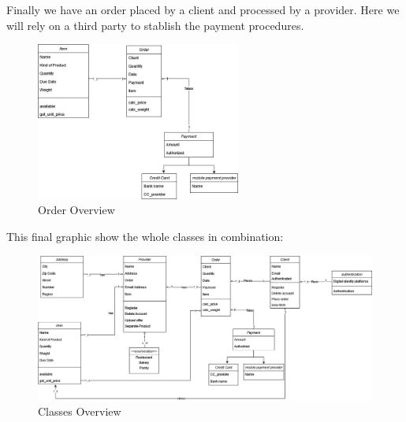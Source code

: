 Finally we have an order placed by a \gls{client} and processed by a \gls{provider}. Here we will rely on a third party 
to stablish the payment procedures.

\begin{figure}[H]
    \centering
    \includegraphics[width=0.6\textwidth]{assets/order_cd.jpg}
    \caption{Order Overview}
    \label{fig:order_cd}
\end{figure}

\newpage
\thispagestyle{lscape}
\begin{landscape}

This final graphic show the whole classes in combination:

\begin{figure}[H]
    \centering
    \includegraphics[width=1.5\textwidth]{assets/classes_CD.jpg}
    \caption{Classes Overview}
    \label{fig:class_CD}
\end{figure}

\end{landscape}
